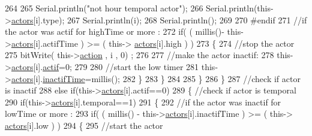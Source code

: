 \begin{DoxyCode}
264                         
265                         Serial.println(\textcolor{stringliteral}{"not hour temporal actor"});
266                         Serial.println(this->\hyperlink{classJetpack_a7e16d2f97837f9712a2e6de1c50d99db}{actors}[i].type);
267                         Serial.println(i);
268                         Serial.println();
269                     
270 \textcolor{preprocessor}{                    #endif}
271                         \textcolor{comment}{//if the actor was actif for highTime or more :}
272                         \textcolor{keywordflow}{if}( ( millis()- this->\hyperlink{classJetpack_a7e16d2f97837f9712a2e6de1c50d99db}{actors}[i].actifTime  ) >= ( this->
      \hyperlink{classJetpack_a7e16d2f97837f9712a2e6de1c50d99db}{actors}[i].high  ) )
273                         \{
274                             \textcolor{comment}{//stop the actor}
275                             bitWrite( this->\hyperlink{classJetpack_aca3142925a7b0834b34ae91d26af7765}{action} , i , 0) ;
276 
277                             \textcolor{comment}{//make the actor inactif:}
278                             this->\hyperlink{classJetpack_a7e16d2f97837f9712a2e6de1c50d99db}{actors}[i].\hyperlink{structJetpack_1_1state_aa177541689bbaea21a4650a083b0df77}{actif}=0;
279 
280                             \textcolor{comment}{//start the low timer}
281                             this->\hyperlink{classJetpack_a7e16d2f97837f9712a2e6de1c50d99db}{actors}[i].\hyperlink{structJetpack_1_1state_aaf817b1f9e7a4d65b9e3ca4726b281f6}{inactifTime}=millis();              
282                         \}
283                     \}           
284                             
285                 \}
286             \}
287             \textcolor{comment}{//check if actor is inactif}
288             \textcolor{keywordflow}{else} \textcolor{keywordflow}{if}(this->\hyperlink{classJetpack_a7e16d2f97837f9712a2e6de1c50d99db}{actors}[i].actif==0)
289             \{   \textcolor{comment}{//check if actor is temporal}
290                 \textcolor{keywordflow}{if}(this->\hyperlink{classJetpack_a7e16d2f97837f9712a2e6de1c50d99db}{actors}[i].temporal==1)
291                 \{
292                     \textcolor{comment}{//if the actor was inactif for lowTime or more :}
293                     \textcolor{keywordflow}{if}( ( millis() - this->\hyperlink{classJetpack_a7e16d2f97837f9712a2e6de1c50d99db}{actors}[i].inactifTime ) >= ( this->
      \hyperlink{classJetpack_a7e16d2f97837f9712a2e6de1c50d99db}{actors}[i].low  ) )
294                     \{
295                         \textcolor{comment}{//start the actor}

\end{DoxyCode}
